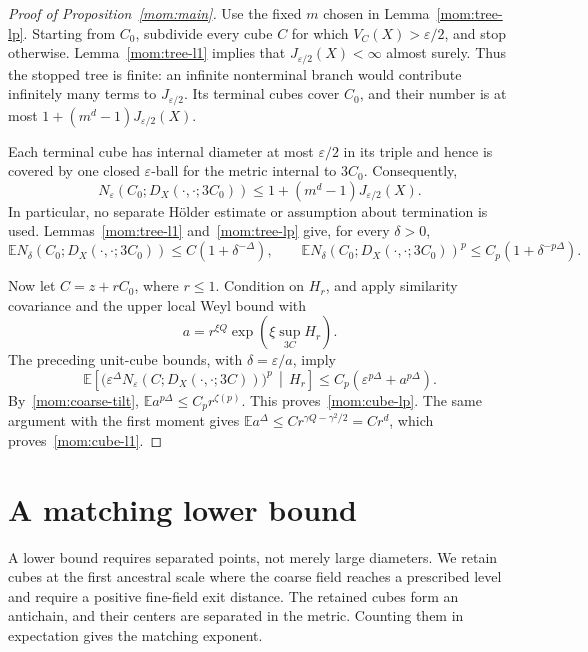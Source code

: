 \documentclass[11pt,letterpaper]{article}
\newcommand{\E}{\mathbb E}
\newcommand{\eps}{\varepsilon}
\theoremstyle{definition}
\theoremstyle{remark}
\numberwithin{equation}{section}
\begin{document}
\begin{proof}[Proof of Proposition~\ref{mom:main}]
Use the fixed $m$ chosen in Lemma~\ref{mom:tree-lp}. Starting from $C_0$, subdivide every cube $C$ for which $V_C(X)>\eps/2$, and stop otherwise. Lemma~\ref{mom:tree-l1} implies that $J_{\eps/2}(X)<\infty$ almost surely.  Thus the stopped tree is finite: an infinite nonterminal branch would contribute infinitely many terms to $J_{\eps/2}$.  Its terminal cubes cover $C_0$, and their number is at most $1+(m^d-1)J_{\eps/2}(X)$.

Each terminal cube has internal diameter at most $\eps/2$ in its triple and hence is covered by one closed $\eps$-ball for the metric internal to $3C_0$. Consequently,
\begin{equation}\label{mom:cover-tree}
 N_\eps(C_0;D_X(\cdot,\cdot;3C_0))
 \le1+(m^d-1)J_{\eps/2}(X).
\end{equation}
In particular, no separate H\"older estimate or assumption about termination is used.  Lemmas~\ref{mom:tree-l1} and~\ref{mom:tree-lp} give, for every $\delta>0$,
\begin{equation*}
 \E N_\delta(C_0;D_X(\cdot,\cdot;3C_0))
     \le C(1+\delta^{-\Delta}),\qquad
 \E N_\delta(C_0;D_X(\cdot,\cdot;3C_0))^p
     \le C_p(1+\delta^{-p\Delta}).
\end{equation*}

Now let $C=z+rC_0$, where $r\le1$. Condition on $H_r$, and apply similarity covariance and the upper local Weyl bound with
\begin{equation*}
 a=r^{\xi Q}\exp\!\left(\xi\sup_{3C}H_r\right).
\end{equation*}
The preceding unit-cube bounds, with $\delta=\eps/a$, imply
\begin{equation*}
 \E\!\left[
   \bigl(\eps^\Delta
      N_\eps(C;D_X(\cdot,\cdot;3C))\bigr)^p
       \,\middle|\,H_r
 \right]
 \le C_p(\eps^{p\Delta}+a^{p\Delta}).
\end{equation*}
By~\eqref{mom:coarse-tilt}, $\E a^{p\Delta}\le C_p r^{\zeta(p)}$. This proves~\eqref{mom:cube-lp}. The same argument with the first moment gives $\E a^\Delta\le C r^{\gamma Q-\gamma^2/2}=Cr^d$, which proves~\eqref{mom:cube-l1}.
\end{proof}

\section{A matching lower bound}\label{low:section}

A lower bound requires separated points, not merely large diameters. We retain cubes at the first ancestral scale where the coarse field reaches a prescribed level and require a positive fine-field exit distance. The retained cubes form an antichain, and their centers are separated in the metric. Counting them in expectation gives the matching exponent.
\end{document}
